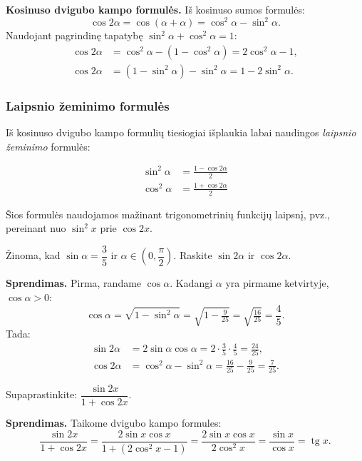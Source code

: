 \textbf{Kosinuso dvigubo kampo formulės.} Iš kosinuso sumos formulės:
\[
  \cos 2\alpha = \cos(\alpha+\alpha)
  = \cos^2\alpha - \sin^2\alpha.
\]
Naudojant pagrindinę tapatybę $\sin^2\alpha + \cos^2\alpha = 1$:
\begin{align*}
  \cos 2\alpha &= \cos^2\alpha - (1-\cos^2\alpha) = 2\cos^2\alpha - 1, \\
  \cos 2\alpha &= (1-\sin^2\alpha) - \sin^2\alpha = 1 - 2\sin^2\alpha.
\end{align*}

\subsubsection*{Laipsnio žeminimo formulės}

Iš kosinuso dvigubo kampo formulių tiesiogiai išplaukia labai naudingos
\emph{laipsnio žeminimo} formulės:

\begin{tcolorbox}[colback=purple!5!white, colframe=purple!60!black,
    title=Laipsnio žeminimo formulės]
\begin{align}
  \sin^2\alpha &= \frac{1 - \cos 2\alpha}{2} \\[4pt]
  \cos^2\alpha &= \frac{1 + \cos 2\alpha}{2}
\end{align}
\end{tcolorbox}

Šios formulės naudojamos mažinant trigonometrinių funkcijų laipsnį, pvz.,
pereinant nuo $\sin^2 x$ prie $\cos 2x$.

\begin{example}
  Žinoma, kad $\sin\alpha = \dfrac{3}{5}$ ir $\alpha \in \left(0,
  \dfrac{\pi}{2}\right)$. Raskite $\sin 2\alpha$ ir $\cos 2\alpha$.

  \textbf{Sprendimas.}
  Pirma, randame $\cos\alpha$. Kadangi $\alpha$ yra pirmame ketvirtyje,
  $\cos\alpha > 0$:
  \[
    \cos\alpha = \sqrt{1-\sin^2\!\alpha} = \sqrt{1-\tfrac{9}{25}}
    = \sqrt{\tfrac{16}{25}} = \frac{4}{5}.
  \]
  Tada:
  \begin{align*}
    \sin 2\alpha &= 2\sin\alpha\cos\alpha
      = 2\cdot\frac{3}{5}\cdot\frac{4}{5} = \frac{24}{25}, \\
    \cos 2\alpha &= \cos^2\!\alpha - \sin^2\!\alpha
      = \frac{16}{25} - \frac{9}{25} = \frac{7}{25}.
  \end{align*}
\end{example}

\begin{example}
  Supaprastinkite: $\dfrac{\sin 2x}{1 + \cos 2x}$.

  \textbf{Sprendimas.} Taikome dvigubo kampo formules:
  \[
    \frac{\sin 2x}{1+\cos 2x}
    = \frac{2\sin x\cos x}{1+(2\cos^2\!x-1)}
    = \frac{2\sin x\cos x}{2\cos^2\!x}
    = \frac{\sin x}{\cos x}
    = \operatorname{tg} x.
  \]
\end{example}

